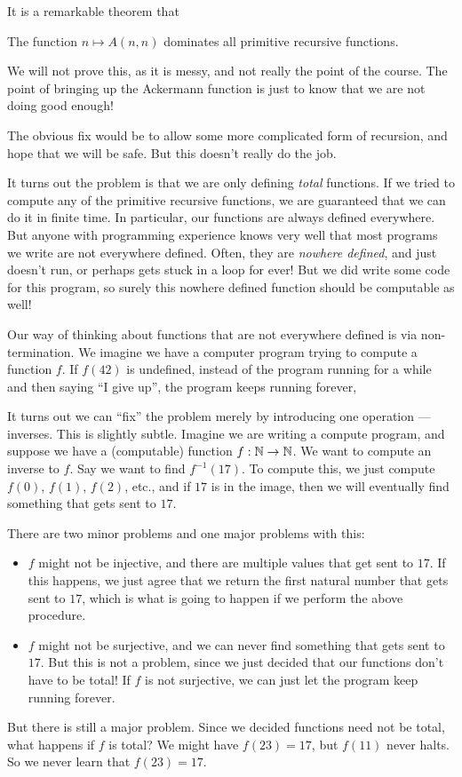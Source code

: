 \documentclass[a4paper]{article}
\begin{document}
It is a remarkable theorem that
\begin{thm}
  The function $n \mapsto A(n, n)$ dominates all primitive recursive functions.
\end{thm}
We will not prove this, as it is messy, and not really the point of the course. The point of bringing up the Ackermann function is just to know that we are not doing good enough!

The obvious fix would be to allow some more complicated form of recursion, and hope that we will be safe. But this doesn't really do the job.

It turns out the problem is that we are only defining \emph{total} functions. If we tried to compute any of the primitive recursive functions, we are guaranteed that we can do it in finite time. In particular, our functions are always defined everywhere. But anyone with programming experience knows very well that most programs we write are not everywhere defined. Often, they are \emph{nowhere defined}, and just doesn't run, or perhaps gets stuck in a loop for ever! But we did write some code for this program, so surely this nowhere defined function should be computable as well!

Our way of thinking about functions that are not everywhere defined is via non-termination. We imagine we have a computer program trying to compute a function $f$. If $f(42)$ is undefined, instead of the program running for a while and then saying ``I give up'', the program keeps running forever,

It turns out we can ``fix'' the problem merely by introducing one operation --- inverses. This is slightly subtle. Imagine we are writing a compute program, and suppose we have a (computable) function $f: \mathbb{N} \to \mathbb{N}$. We want to compute an inverse to $f$. Say we want to find $f^{-1}(17)$. To compute this, we just compute $f(0)$, $f(1)$, $f(2)$, etc., and if $17$ is in the image, then we will eventually find something that gets sent to $17$.

There are two minor problems and one major problems with this:
\begin{itemize}
  \item $f$ might not be injective, and there are multiple values that get sent to $17$. If this happens, we just agree that we return the first natural number that gets sent to $17$, which is what is going to happen if we perform the above procedure.
  \item $f$ might not be surjective, and we can never find something that gets sent to $17$. But this is not a problem, since we just decided that our functions don't have to be total! If $f$ is not surjective, we can just let the program keep running forever.
\end{itemize}
But there is still a major problem. Since we decided functions need not be total, what happens if $f$ is total? We might have $f(23) = 17$, but $f(11)$ never halts. So we never learn that $f(23) = 17$.
\end{document}
